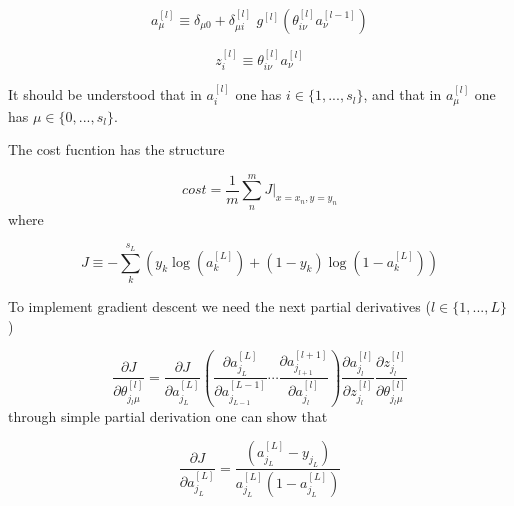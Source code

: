 \documentclass[a4paper,11pt]{article}
\newcommand{\na}[2]{a_{#1}^{[#2]}}
\newcommand{\nz}[2]{z_{#1}^{[#2]}}
\newcommand{\nt}[3]{\theta_{#1 #2}^{[#3]}}
\newcommand{\ff}[2]{#1 \left(#2 \right)}
\begin{document}
\begin{equation}
    \na{\mu}{l} \equiv \delta_{\mu0} +\delta_{\mu i }^{[l]}\,\,
    \ff{g^{[l]}}{  \nt{i}{\nu}{l}\na{\nu }{l-1}  }  %
\end{equation}

\begin{equation}
    \nz{i}{l}\equiv \nt{i}{\nu}{l}\na{\nu }{l} %
\end{equation}



It should be understood that in $\na{i}{l}$ 
one has  $i \in \{1,..., s_l\} $, 
and that in $\na{\mu}{l}$ one has $ \mu \in \{0,..., s_l\}$.


The cost fucntion has the structure

\begin{equation}
    cost=\frac1m \sum^m_n 
    J \Big\vert_{x=x_n,y=y_n}  %
\end{equation}
where

\begin{equation}
    J\equiv -\sum^{s_L}_k
    \left(
        y_k\ff{\log}{\na{k}{L}}  %
        +(1-y_k)\ff{\log}{1-\na{k}{L}} 
    \right)
\end{equation}

To implement gradient descent we need 
the next partial derivatives ($l\in\{1,...,L\} $)

\begin{equation}
    \frac{\partial J }{\partial  \nt{j_l}{\mu}{l}  } 
   =\frac{\partial J  }{\partial \na{j_L}{L}  }
    \left(
    \frac{\partial \na{j_L}{L}  }{\partial \na{j_{L-1}}{L-1}  }
    \cdots
    \frac{\partial \na{j_{l+1}}{l+1}   }{\partial \na{j_l}{l}   }
    \right)
    \frac{\partial \na{j_l}{l}   }{\partial \nz{j_l}{l}   }
    \frac{\partial \nz{j_l}{l} }
        {\partial \nt{j_l}{\mu}{l}  }
\end{equation}
through simple partial derivation one can show that 

\begin{equation}
    \frac{\partial J  }{\partial \na{j_L}{L}  }
    = \frac{(\na{j_L}{L} -y_{j_L})}{\na{j_L}{L} (1-\na{j_L}{L} )} 
\end{equation}
\end{document}
